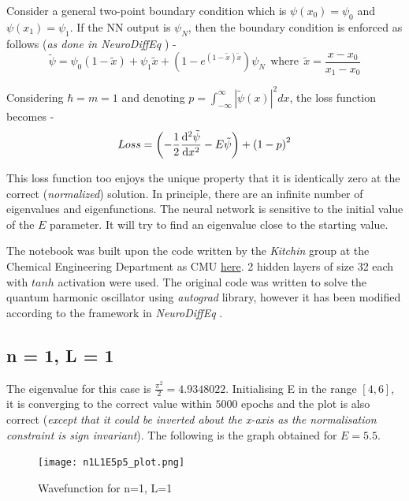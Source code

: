 \documentclass{article}
\newcommand{\psitilde}{\tilde{\psi}}
\newcommand{\psiN}{\psi_N}
\newcommand{\NeuroDiffEq}{\textit{NeuroDiffEq} }
\begin{document}
\justify
Consider a general two-point boundary condition which is $\displaystyle{\psi(x_0) = \psi_0}$ and $\displaystyle{ \psi(x_1) = \psi_1}$. If the NN output is $\psiN$, then the boundary condition is enforced as follows (\textit{as done in \NeuroDiffEq}) -
$$\displaystyle{
\psitilde = \psi_0(1 - \tilde{x}) + \psi_1\tilde{x} + (1 - e^{(1-\tilde{x})\tilde{x}})\psiN \ \ \text{where} \ \ \tilde{x} = \frac{x-x_0}{x_1-x_0}
}$$

\justify
Considering $\hbar = m = 1$ and denoting $\displaystyle{p = \int_{-\infty}^{\infty} |\psitilde(x)|^2dx}$, the loss function becomes -
$$\displaystyle{
Loss = \left(-\frac{1}{2} \dv[2]{\psitilde}{x} - E\psitilde\right) + \left(1 - 
p\right)^2
}
$$

\justify
This loss function too enjoys the unique property that it is identically zero at the correct (\textit{normalized}) solution. In principle, there are an infinite number of eigenvalues and eigenfunctions. The neural network is sensitive to the initial value of the $E$ parameter. It will try to find an eigenvalue close to the starting value.

\justify
The notebook was built upon the code written by the \textit{Kitchin} group at the Chemical Engineering Department as CMU \href{https://kitchingroup.cheme.cmu.edu/blog/2017/11/29/Solving-an-eigenvalue-differential-equation-with-a-neural-network/}{here}. 2 hidden layers of size 32 each with $tanh$ activation were used. The original code was written to solve the quantum harmonic oscillator using \textit{autograd} library, however it has been modified according to the framework in \NeuroDiffEq.

\subsection{n = 1, L = 1}

\justify
The eigenvalue for this case is $\displaystyle{\frac{\pi^2}{2}} = 4.9348022$. Initialising E in the range $[4, 6]$, it is converging to the correct value within $5000$ epochs and the plot is also correct (\textit{except that it could be inverted about the x-axis as the normalisation constraint is sign invariant}). The following is the graph obtained for $E=5.5$.

\begin{figure}[!htb]
    \centering
    \texttt{[image: n1L1E5p5\_plot.png]}
    \label{fig:n1L1_plot}
    \caption{Wavefunction for n=1, L=1}
\end{figure}
\end{document}
